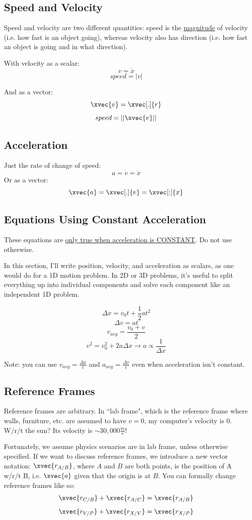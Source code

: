 \documentclass{article}
\begin{document}
\subsection{Speed and Velocity}
Speed and velocity are two different quantities: speed is the \uline{magnitude} of velocity (i.e. how fast is an object going), whereas velocity also has direction (i.e. how fast an object is going
and in what direction).

With velocity as a scalar:
$$ v = \dot{x} $$
$$ speed = |v| $$

And as a vector:
$$ \xvec{v} = \xvec[.]{r} $$
$$ speed = ||\xvec{v}|| $$

\subsection{Acceleration}
Just the rate of change of speed:
$$ a = \dot{v} = \ddot{x} $$
Or as a vector:
$$ \xvec{a} = \xvec[.]{v} = \xvec[:]{x} $$

\subsection{Equations Using Constant Acceleration}
These equations are \uline{only true when acceleration is CONSTANT}. Do not use otherwise.

In this section, I'll write position, velocity, and acceleration as scalars, as one would do for a 1D motion problem.
In 2D or 3D problems, it's useful to split everything up into individual components and solve each component like an independent 1D problem.

$$ \Delta x = v_0t + \frac{1}{2}at^2 $$
$$ \Delta v = at $$
$$ v_{avg} = \frac{v_0+v}{2} $$
$$ v^2 = v_0^2+2a\Delta x \to a \propto \frac{1}{\Delta x} $$

Note: you can use $ v_{avg} = \frac{\Delta x}{t} $ and $ a_{avg} = \frac{\Delta v}{t} $ even when acceleration isn't constant.

\subsection{Reference Frames}
Reference frames are arbitrary. In ``lab frame", which is the reference frame where walls, furniture, etc. are assumed to have $ v = 0 $, my computer's velocity is 0. W/r/t the sun? Its velocity is
$ \sim30,000 \frac{m}{s} $!

Fortunately, we assume physics scenarios are in lab frame, unless otherwise specified.
If we want to discuss reference frames, we introduce a new vector notation: $ \xvec{r_{A/B}} $, where $ A $ and $ B $ are both points, is the position of A w/r/t B, i.e. $ \xvec{a} $ given that
the origin is at $ B $. You can formally change reference frames like so:
$$ \xvec{r_{C/B}} + \xvec{r_{A/C}} = \xvec{r_{A/B}} $$
$$ \xvec{r_{V/P}} + \xvec{r_{X/V}} = \xvec{r_{X/P}} $$
\end{document}
